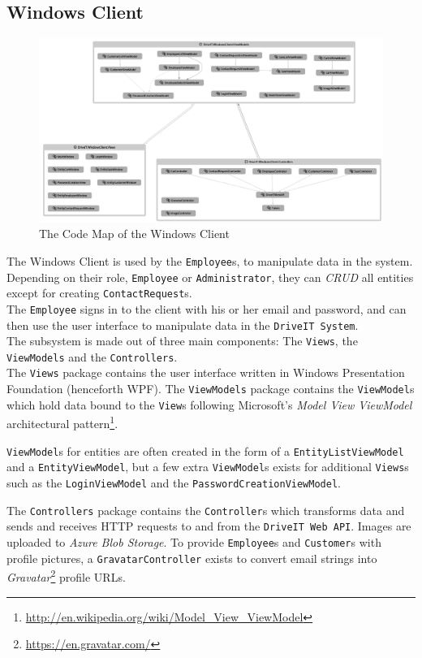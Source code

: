 \subsection{Windows Client} 
\begin{figure}[H]
	\centering
	\includegraphics[width=\textwidth]{Figures/WindowsClientCodeMap}
	\caption{The Code Map of the Windows Client}
	\label{fig:WindowsClientCodeMap}
\end{figure}
The Windows Client is used by the \texttt{Employee}s, to manipulate data in the system. Depending on their role, \texttt{Employee} or \texttt{Administrator}, they can \textit{CRUD} all entities except for creating \texttt{ContactRequest}s.\\

The \texttt{Employee} signs in to the client with his or her email and password, and can then use the user interface to manipulate data in the \texttt{DriveIT System}.\\
The subsystem is made out of three main components: The \texttt{Views}, the \texttt{ViewModels} and the \texttt{Controllers}.\\
The \texttt{Views} package contains the user interface written in Windows Presentation Foundation (henceforth WPF). The \texttt{ViewModels} package contains the \texttt{ViewModel}s which hold data bound to the \texttt{View}s following Microsoft's \textit{Model View ViewModel} architectural pattern\footnote{\url{http://en.wikipedia.org/wiki/Model_View_ViewModel}}.

\texttt{ViewModel}s for entities are often created in the form of a \texttt{EntityListViewModel} and a \texttt{EntityViewModel}, but a few extra \texttt{ViewModel}s exists for additional \texttt{Views}s such as the \texttt{LoginViewModel} and the \texttt{PasswordCreationViewModel}.

The \texttt{Controllers} package contains the \texttt{Controller}s which transforms data and sends and receives HTTP requests to and from the \texttt{DriveIT Web API}. Images are uploaded to \textit{Azure Blob Storage}. To provide \texttt{Employee}s and \texttt{Customer}s with profile pictures, a \texttt{GravatarController} exists to convert email strings into \textit{Gravatar}\footnote{\url{https://en.gravatar.com/}} profile URLs.

